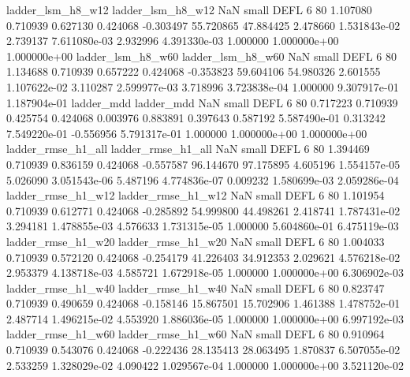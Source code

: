        ladder_lsm_h8_w12        ladder_lsm_h8_w12                   NaN      small     DEFL                 6 80 1.107080       0.710939 0.627130       0.424068   -0.303497     55.720865     47.884425     2.478660   1.531843e-02  2.739137 7.611080e-03     2.932996   4.391330e-03            1.000000    1.000000e+00        1.000000e+00
       ladder_lsm_h8_w60        ladder_lsm_h8_w60                   NaN      small     DEFL                 6 80 1.134688       0.710939 0.657222       0.424068   -0.353823     59.604106     54.980326     2.601555   1.107622e-02  3.110287 2.599977e-03     3.718996   3.723838e-04            1.000000    9.307917e-01        1.187904e-01
              ladder_mdd               ladder_mdd                   NaN      small     DEFL                 6 80 0.717223       0.710939 0.425754       0.424068    0.003976      0.883891      0.397643     0.587192   5.587490e-01  0.313242 7.549220e-01    -0.556956   5.791317e-01            1.000000    1.000000e+00        1.000000e+00
      ladder_rmse_h1_all       ladder_rmse_h1_all                   NaN      small     DEFL                 6 80 1.394469       0.710939 0.836159       0.424068   -0.557587     96.144670     97.175895     4.605196   1.554157e-05  5.026090 3.051543e-06     5.487196   4.774836e-07            0.009232    1.580699e-03        2.059286e-04
      ladder_rmse_h1_w12       ladder_rmse_h1_w12                   NaN      small     DEFL                 6 80 1.101954       0.710939 0.612771       0.424068   -0.285892     54.999800     44.498261     2.418741   1.787431e-02  3.294181 1.478855e-03     4.576633   1.731315e-05            1.000000    5.604860e-01        6.475119e-03
      ladder_rmse_h1_w20       ladder_rmse_h1_w20                   NaN      small     DEFL                 6 80 1.004033       0.710939 0.572120       0.424068   -0.254179     41.226403     34.912353     2.029621   4.576218e-02  2.953379 4.138718e-03     4.585721   1.672918e-05            1.000000    1.000000e+00        6.306902e-03
      ladder_rmse_h1_w40       ladder_rmse_h1_w40                   NaN      small     DEFL                 6 80 0.823747       0.710939 0.490659       0.424068   -0.158146     15.867501     15.702906     1.461388   1.478752e-01  2.487714 1.496215e-02     4.553920   1.886036e-05            1.000000    1.000000e+00        6.997192e-03
      ladder_rmse_h1_w60       ladder_rmse_h1_w60                   NaN      small     DEFL                 6 80 0.910964       0.710939 0.543076       0.424068   -0.222436     28.135413     28.063495     1.870837   6.507055e-02  2.533259 1.328029e-02     4.090422   1.029567e-04            1.000000    1.000000e+00        3.521120e-02
